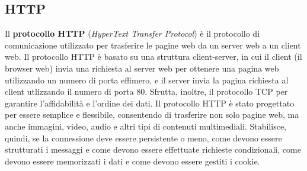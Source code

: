 \documentclass[12pt]{report}
\begin{document}
	\subsection{HTTP}
	Il \textbf{protocollo HTTP} (\textit{HyperText Transfer Protocol}) è il protocollo di comunicazione utilizzato per trasferire le pagine web da un server web a un client web. Il protocollo HTTP è basato su una struttura client-server, in cui il client (il browser web) invia una richiesta al server web per ottenere una pagina web utilizzando un numero di porta effimero, e il server invia la pagina richiesta al client utlizzando il numero di porta 80.  Sfrutta, inoltre, il protocollo TCP per garantire l'affidabilità e l'ordine dei dati. Il protocollo HTTP è stato progettato per essere semplice e flessibile, consentendo di trasferire non solo pagine web, ma anche immagini, video, audio e altri tipi di contenuti multimediali.
	Stabilisce, quindi, se la connessione deve essere persistente o meno, come devono essere strutturati i messaggi e come devono essere effettuate richieste condizionali, come devono essere memorizzati i dati e come devono essere gestiti i cookie.
\end{document}
